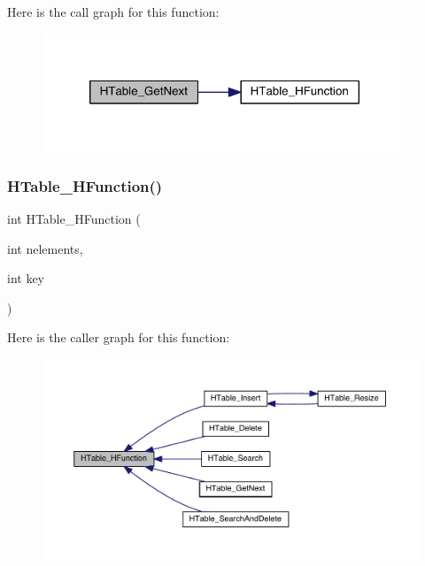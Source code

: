 Here is the call graph for this function\+:\nopagebreak
\begin{figure}[H]
\begin{center}
\leavevmode
\includegraphics[width=308pt]{a00077_a06dc1c772847749d0af6be1ba7328e4e_cgraph}
\end{center}
\end{figure}
\mbox{\label{a00077_afe255e126a6c4eec5efb11c3691b3155}} 
\subsubsection{\texorpdfstring{H\+Table\+\_\+\+H\+Function()}{HTable\_HFunction()}}
{\footnotesize\ttfamily int H\+Table\+\_\+\+H\+Function (\begin{DoxyParamCaption}\item[{int}]{nelements,  }\item[{int}]{key }\end{DoxyParamCaption})}

Here is the caller graph for this function\+:\nopagebreak
\begin{figure}[H]
\begin{center}
\leavevmode
\includegraphics[width=350pt]{a00077_afe255e126a6c4eec5efb11c3691b3155_icgraph}
\end{center}
\end{figure}
\mbox{\label{a00077_a39853dc7129323e7846d895c9026ad6f}} 
